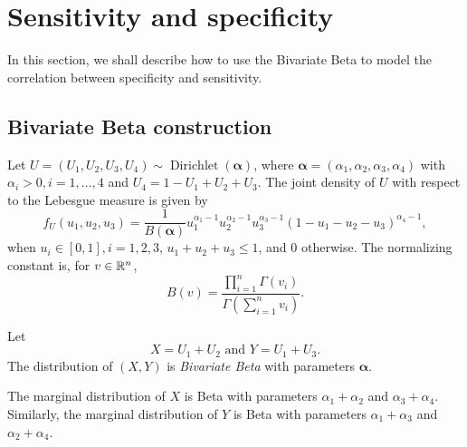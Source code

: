\section{Sensitivity and specificity}

In this section, we shall describe how to use the Bivariate Beta
\cite[]{olkin2015constructions} to model the correlation between specificity
and sensitivity.

\subsection{Bivariate Beta construction}

Let $U = (U_1, U_2, U_3, U_4) \sim
\operatorname{Dirichlet}(\boldsymbol{\alpha})$, where $\boldsymbol{\alpha} =
(\alpha_1, \alpha_2, \alpha_3, \alpha_4)$ with $\alpha_i > 0, i = 1,\dots,4$
and $U_4 = 1 - U_1 + U_2 + U_3$. The joint density of $U$ with respect to the
Lebesgue measure is given by
\begin{equation}
  f_U(u_1, u_2, u_3) = \frac{1}{B(\boldsymbol{\alpha})}u_1^{\alpha_1-1}u_2^{\alpha_2-1}u_3^{\alpha_3-1}(1-u_1-u_2-u_3)^{\alpha_4-1}, 
\end{equation}
when $u_i \in [0,1], i = 1,2,3$, $u_1 + u_2 + u_3 \le 1$, and $0$ otherwise.
The normalizing constant is, for $v \in \mathbb{R}^n$,
$$B(v) = \frac{\prod_{i=1}^n \Gamma(v_i)}{\Gamma\left(\sum_{i=1}^n v_i\right)}.$$ 

\begin{definition}
  Let 
  \begin{equation}
    X = U_1 + U_2 \text{ and } Y = U_1 + U_3.
  \end{equation} 
    The distribution of $(X,Y)$ is {\em Bivariate Beta} with parameters
    $\boldsymbol{\alpha}$. 
\end{definition}

\begin{proposition}
  The marginal distribution of $X$ is Beta with parameters $\alpha_1 +
  \alpha_2$ and $\alpha_3 + \alpha_4$. Similarly, the marginal distribution of
  $Y$ is Beta with parameters $\alpha_1 + \alpha_3$ and $\alpha_2 + \alpha_4$.
\end{proposition}

